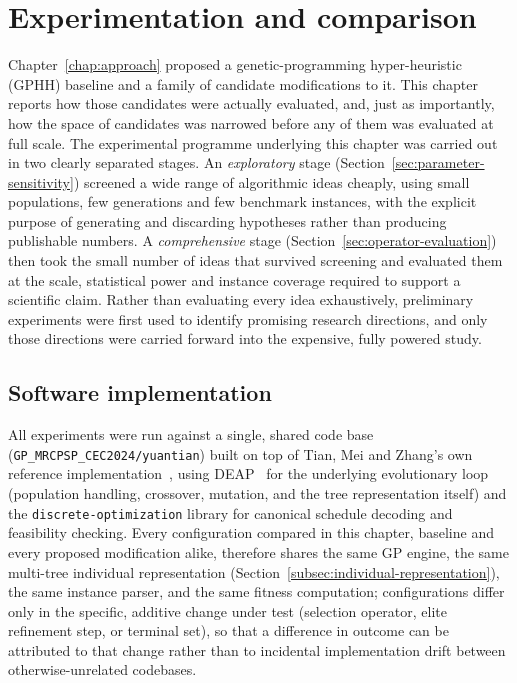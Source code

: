 \chapter{Experimentation and comparison}
\label{chap:experiments}

Chapter~\ref{chap:approach} proposed a genetic-programming hyper-heuristic
(GPHH) baseline and a family of candidate modifications to it. This chapter
reports how those candidates were actually evaluated, and, just as
importantly, how the space of candidates was narrowed before any of them
was evaluated at full scale. The experimental programme underlying this
chapter was carried out in two clearly separated stages. An
\emph{exploratory} stage (Section~\ref{sec:parameter-sensitivity}) screened
a wide range of algorithmic ideas cheaply, using small populations, few
generations and few benchmark instances, with the explicit purpose of
generating and discarding hypotheses rather than producing publishable
numbers. A \emph{comprehensive} stage (Section~\ref{sec:operator-evaluation})
then took the small number of ideas that survived screening and evaluated
them at the scale, statistical power and instance coverage required to
support a scientific claim. Rather than evaluating every idea exhaustively,
preliminary experiments were first used to identify promising research
directions, and only those directions were carried forward into the
expensive, fully powered study. 

\section{Software implementation}
\label{sec:software-implementation}

All experiments were run against a single, shared code base
(\texttt{GP\_MRCPSP\_CEC2024/yuantian}) built on top of Tian, Mei and
Zhang's own reference implementation~\cite{Tian2024GPHH}, using
DEAP~\cite{derainville2012deap} for the underlying evolutionary loop
(population handling, crossover, mutation, and the tree representation
itself) and the \texttt{discrete-optimization} library for canonical
schedule decoding and feasibility checking. Every configuration compared in
this chapter, baseline and every proposed modification alike, therefore
shares the same GP engine, the same multi-tree individual representation
(Section~\ref{subsec:individual-representation}), the same instance parser,
and the same fitness computation; configurations differ only in the
specific, additive change under test (selection operator, elite refinement
step, or terminal set), so that a difference in outcome can be attributed
to that change rather than to incidental implementation drift between
otherwise-unrelated codebases.

